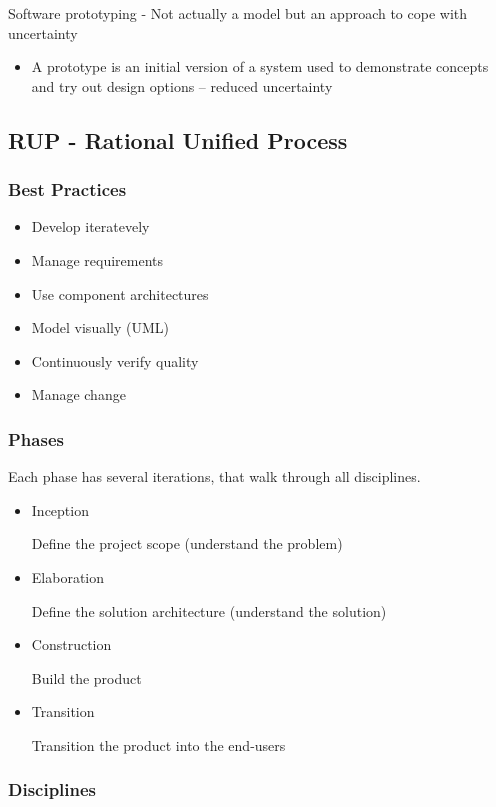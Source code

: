 \documentclass[../ESOF_notes.tex]{subfiles}
\begin{document}
Software prototyping - Not actually a model but an approach to cope with uncertainty
\begin{itemize}
    \item A prototype is an initial version of a system used to demonstrate concepts and try out design options – reduced uncertainty
\end{itemize}

\subsection{RUP - Rational Unified Process}

\subsubsection{Best Practices}
\begin{itemize}
    \item Develop iteratevely
    \item Manage requirements
    \item Use component architectures
    \item Model visually (UML)
    \item Continuously verify quality
    \item Manage change
\end{itemize}

\subsubsection{Phases}

Each phase has several iterations, that walk through all disciplines.

\begin{itemize}
    \item Inception
    
    Define the project scope (understand the problem)
    \item Elaboration
    
    Define the solution architecture (understand the solution)
    \item Construction
    
    Build the product
    \item Transition
    
    Transition the product into the end-users
\end{itemize}

\subsubsection{Disciplines}
\end{document}

